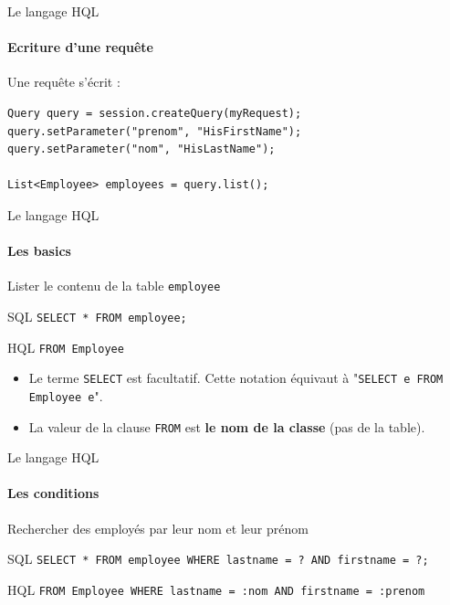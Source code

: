 \documentclass[compact]{beamer}%
\begin{document}
\begin{frame}[fragile]{Le langage HQL}
	\framesubtitle{Ecriture d'une requête}
	
	Une requête s'écrit : 
	\begin{lstlisting}
Query query = session.createQuery(myRequest);
query.setParameter("prenom", "HisFirstName");
query.setParameter("nom", "HisLastName");

List<Employee> employees = query.list();
	\end{lstlisting}

\end{frame}

\begin{frame}[fragile]{Le langage HQL}
	\framesubtitle{Les basics}
	
	\begin{block}{}
		\center
		Lister le contenu de la table \texttt{employee}
	\end{block}
	
	\begin{exampleblock}{SQL}
		\texttt{SELECT * FROM employee;}
	\end{exampleblock}

	\pause
	\begin{exampleblock}{HQL}
		\texttt{FROM Employee}
	\end{exampleblock}
	
	\pause
	\begin{itemize}
		\item Le terme \texttt{SELECT} est facultatif. Cette notation équivaut à "\texttt{SELECT e FROM Employee e}".
		\item La valeur de la clause \texttt{FROM} est \textbf{le nom de la classe} (pas de la table).
	\end{itemize}

\end{frame}

\begin{frame}[fragile]{Le langage HQL}
	\framesubtitle{Les conditions}
	
	\begin{block}{}
		\center
		Rechercher des employés par leur nom et leur prénom
	\end{block}
	
	\begin{exampleblock}{SQL}
		\texttt{SELECT * FROM employee WHERE lastname = ? AND firstname = ?;}
	\end{exampleblock}

	\pause
	\begin{exampleblock}{HQL}
		\texttt{FROM Employee WHERE lastname = :nom AND firstname = :prenom}
	\end{exampleblock}

\end{frame}
\end{document}
